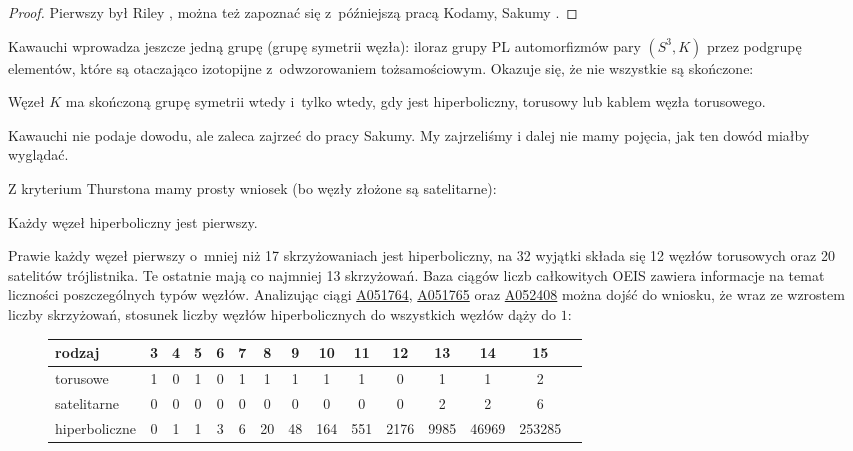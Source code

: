 \begin{proof}
%
%
%
    Pierwszy był Riley \cite[s. 124]{riley79}, można też zapoznać się z~późniejszą pracą  Kodamy, Sakumy \cite{kodama92}.
\end{proof}

Kawauchi \cite[s. 131]{kawauchi96} wprowadza jeszcze jedną grupę (grupę symetrii węzła): iloraz grupy PL automorfizmów pary $(S^3, K)$ przez podgrupę elementów, które są otaczająco izotopijne z~odwzorowaniem tożsamościowym.
Okazuje się, że nie wszystkie są skończone:

\begin{proposition}
    Węzeł $K$ ma skończoną grupę symetrii wtedy i~tylko wtedy, gdy jest hiperboliczny, torusowy lub kablem węzła torusowego.
\end{proposition}

Kawauchi nie podaje dowodu, ale zaleca zajrzeć do pracy Sakumy.
My zajrzeliśmy i dalej nie mamy pojęcia, jak ten dowód miałby wyglądać.

Z kryterium Thurstona mamy prosty wniosek (bo węzły złożone są satelitarne):

\begin{corollary}
    Każdy węzeł hiperboliczny jest pierwszy.
\end{corollary}

Prawie każdy węzeł pierwszy o~mniej niż 17 skrzyżowaniach jest hiperboliczny, na 32 wyjątki składa się 12 węzłów torusowych oraz 20 satelitów trójlistnika.
Te ostatnie mają co najmniej 13 skrzyżowań.
Baza ciągów liczb całkowitych OEIS zawiera informacje na temat liczności poszczególnych typów węzłów.
Analizując ciągi \href{https://oeis.org/A051764}{A051764}, \href{https://oeis.org/A051765}{A051765} oraz \href{https://oeis.org/A052408}{A052408} można dojść do wniosku, że wraz ze wzrostem liczby skrzyżowań, stosunek liczby węzłów hiperbolicznych do wszystkich węzłów dąży do $1$:

\begin{figure}[H]
\renewcommand*{\arraystretch}{1.4}
\footnotesize
\begin{longtable}{lcccccccccccccc}
\hline
    \textbf{rodzaj} & 3 & 4 & 5 & 6 & 7 & 8  & 9  & 10  & 11  & 12   & 13   & 14    & 15     \\ \hline \endhead
    torusowe        & 1 & 0 & 1 & 0 & 1 & 1  & 1  & 1   & 1   & 0    & 1    & 1     & 2      \\
    satelitarne     & 0 & 0 & 0 & 0 & 0 & 0  & 0  & 0   & 0   & 0    & 2    & 2     & 6      \\
    hiperboliczne   & 0 & 1 & 1 & 3 & 6 & 20 & 48 & 164 & 551 & 2176 & 9985 & 46969 & 253285 \\
    \hline
\end{longtable}
\normalsize
\end{figure}

